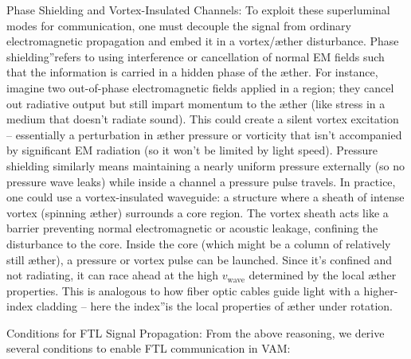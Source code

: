 Phase Shielding and Vortex-Insulated Channels: To exploit these superluminal modes for communication, one must decouple the signal from ordinary electromagnetic propagation and embed it in a vortex/æther disturbance. \grqq Phase shielding\textquotedblright refers to using interference or cancellation of normal EM fields such that the information is carried in a hidden phase of the æther. For instance, imagine two out-of-phase electromagnetic fields applied in a region; they cancel out radiative output but still impart momentum to the æther (like stress in a medium that doesn't radiate sound). This could create a silent vortex excitation – essentially a perturbation in æther pressure or vorticity that isn't accompanied by significant EM radiation (so it won't be limited by light speed). Pressure shielding similarly means maintaining a nearly uniform pressure externally (so no pressure wave leaks) while inside a channel a pressure pulse travels. In practice, one could use a vortex-insulated waveguide: a structure where a sheath of intense vortex (spinning æther) surrounds a core region. The vortex sheath acts like a barrier preventing normal electromagnetic or acoustic leakage, confining the disturbance to the core. Inside the core (which might be a column of relatively still æther), a pressure or vortex pulse can be launched. Since it's confined and not radiating, it can race ahead at the high $v_\text{wave}$ determined by the local æther properties. This is analogous to how fiber optic cables guide light with a higher-index cladding – here the \grqq index\textquotedblright is the local properties of æther under rotation.


Conditions for FTL Signal Propagation: From the above reasoning, we derive several conditions to enable FTL communication in VAM:


